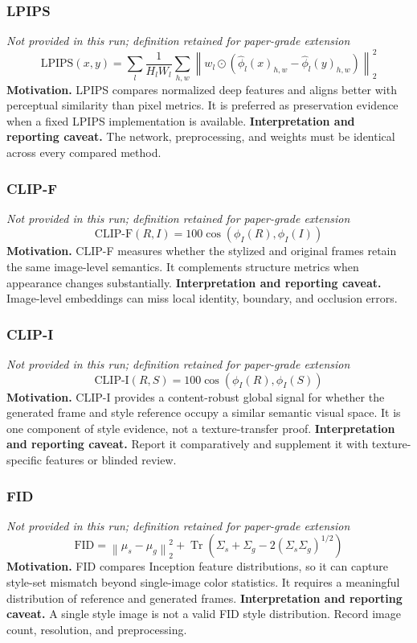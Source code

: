 \documentclass[10pt]{article}
\begin{document}
\subsubsection*{LPIPS}
\textit{Not provided in this run; definition retained for paper-grade extension}
\begin{equation*}
\mathrm{LPIPS}(x,y)=\sum_l\frac{1}{H_lW_l}\sum_{h,w}\left\|w_l\odot(\hat\phi_l(x)_{h,w}-\hat\phi_l(y)_{h,w})\right\|_2^2
\end{equation*}
\textbf{Motivation.} LPIPS compares normalized deep features and aligns better with perceptual similarity than pixel metrics. It is preferred as preservation evidence when a fixed LPIPS implementation is available.
\textbf{Interpretation and reporting caveat.} The network, preprocessing, and weights must be identical across every compared method.
\subsubsection*{CLIP-F}
\textit{Not provided in this run; definition retained for paper-grade extension}
\begin{equation*}
\mathrm{CLIP\text{-}F}(R,I)=100\cos\!\left(\phi_I(R),\phi_I(I)\right)
\end{equation*}
\textbf{Motivation.} CLIP-F measures whether the stylized and original frames retain the same image-level semantics. It complements structure metrics when appearance changes substantially.
\textbf{Interpretation and reporting caveat.} Image-level embeddings can miss local identity, boundary, and occlusion errors.
\subsubsection*{CLIP-I}
\textit{Not provided in this run; definition retained for paper-grade extension}
\begin{equation*}
\mathrm{CLIP\text{-}I}(R,S)=100\cos\!\left(\phi_I(R),\phi_I(S)\right)
\end{equation*}
\textbf{Motivation.} CLIP-I provides a content-robust global signal for whether the generated frame and style reference occupy a similar semantic visual space. It is one component of style evidence, not a texture-transfer proof.
\textbf{Interpretation and reporting caveat.} Report it comparatively and supplement it with texture-specific features or blinded review.
\subsubsection*{FID}
\textit{Not provided in this run; definition retained for paper-grade extension}
\begin{equation*}
\mathrm{FID}=\left\|\mu_s-\mu_g\right\|_2^2+\operatorname{Tr}\!\left(\Sigma_s+\Sigma_g-2(\Sigma_s\Sigma_g)^{1/2}\right)
\end{equation*}
\textbf{Motivation.} FID compares Inception feature distributions, so it can capture style-set mismatch beyond single-image color statistics. It requires a meaningful distribution of reference and generated frames.
\textbf{Interpretation and reporting caveat.} A single style image is not a valid FID style distribution. Record image count, resolution, and preprocessing.
\end{document}
